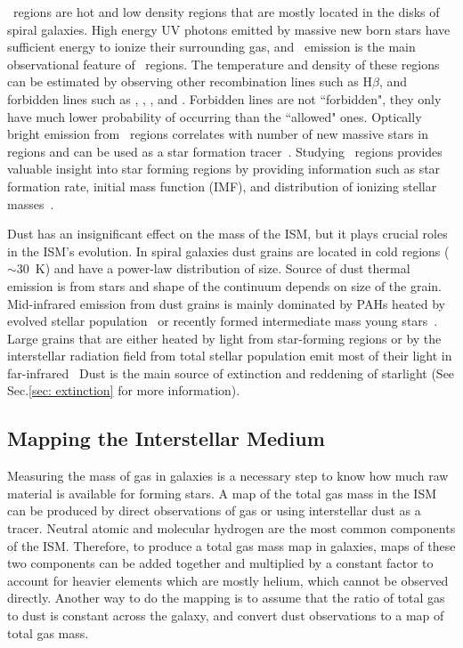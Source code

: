 \hii~regions are hot and low density regions that are mostly located in the disks of spiral galaxies.
High energy UV photons emitted by massive new born stars have sufficient energy to ionize their surrounding gas, and
~\halpha emission is the main observational feature of \hii~regions.
The temperature and density of these regions can be estimated by observing other recombination lines such as H$\beta$, and forbidden lines such as \sii, \oii, \oiii, and \nii. 
Forbidden lines are not ``forbidden", they only have much lower probability of occurring than the ``allowed" ones.
Optically bright \halpha emission from \hii~regions correlates with number of new massive stars in regions and can be used as a star formation tracer~\citep[e.g.][]{Kennicutt98b,Calzetti13}.
Studying \hii~regions provides valuable insight into star forming regions by providing information such as star formation rate, initial mass function (IMF), and distribution of ionizing stellar masses~\citep[][and references therein]{Azimlu11}.


Dust has an insignificant effect on the mass of the ISM, but it plays crucial roles in the ISM's evolution.
In spiral galaxies dust grains are located in cold regions ($\sim$30~K) and have a power-law distribution of size.
Source of dust thermal emission is from stars and shape of the continuum depends on size of the grain.
Mid-infrared emission from dust grains is mainly dominated by PAHs heated by evolved stellar population~\cite{Smith07a} or recently formed intermediate mass young stars~\cite{Peeters04}. 
Large grains that are either heated by light from star-forming regions or by the interstellar radiation field from total stellar population emit most of their light in far-infrared~\citep[e.g.][]{Calapa14, lu14}
Dust is the main source of extinction and reddening of starlight (See Sec.\ref{sec: extinction} for more information).

\subsection{Mapping the Interstellar Medium} 
\label{sec: ismmap}
Measuring the mass of gas in galaxies is a necessary step to know how much raw material is available for forming stars.
A map of the total gas mass in the ISM can be produced by direct observations of gas or using interstellar dust as a tracer. 
Neutral atomic and molecular hydrogen are the most common components of the ISM. 
Therefore, to produce a total gas mass map in galaxies, maps of these two components can be added together and multiplied by a constant factor to account for heavier elements which are mostly helium, which cannot be observed directly. 
Another way to do the mapping is to assume that the ratio of total gas to dust is constant across the galaxy, and convert dust observations to a map of total gas mass.

